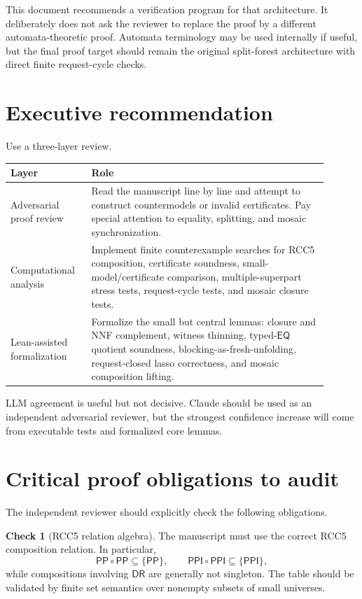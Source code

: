 \documentclass[11pt]{article}
\newcommand{\EQ}{\mathsf{EQ}}
\newcommand{\PP}{\mathsf{PP}}
\newcommand{\PPI}{\mathsf{PPI}}
\newcommand{\DR}{\mathsf{DR}}
\theoremstyle{definition}
\newtheorem{checkitem}{Check}
\theoremstyle{plain}
\begin{document}
This document recommends a verification program for that architecture.  It deliberately does not ask the reviewer to replace the proof by a different automata-theoretic proof.  Automata terminology may be used internally if useful, but the final proof target should remain the original split-forest architecture with direct finite request-cycle checks.

\section{Executive recommendation}

Use a three-layer review.
\begin{center}
\begin{tabular}{p{0.22\linewidth}p{0.68\linewidth}}
\toprule
Layer & Role \\
\midrule
Adversarial proof review & Read the manuscript line by line and attempt to construct countermodels or invalid certificates.  Pay special attention to equality, splitting, and mosaic synchronization. \\
Computational analysis & Implement finite counterexample searches for RCC5 composition, certificate soundness, small-model/certificate comparison, multiple-superpart stress tests, request-cycle tests, and mosaic closure tests. \\
Lean-assisted formalization & Formalize the small but central lemmas: closure and NNF complement, witness thinning, typed-\(\EQ\) quotient soundness, blocking-as-fresh-unfolding, request-closed lasso correctness, and mosaic composition lifting. \\
\bottomrule
\end{tabular}
\end{center}

LLM agreement is useful but not decisive.  Claude should be used as an independent adversarial reviewer, but the strongest confidence increase will come from executable tests and formalized core lemmas.

\section{Critical proof obligations to audit}

The independent reviewer should explicitly check the following obligations.

\begin{checkitem}[RCC5 relation algebra]
The manuscript must use the correct RCC5 composition relation.  In particular,
\[
\PP\circ\PP \subseteq \{\PP\},\qquad
\PPI\circ\PPI \subseteq \{\PPI\},
\]
while compositions involving \(\DR\) are generally not singleton.  The table should be validated by finite set semantics over nonempty subsets of small universes.
\end{checkitem}
\end{document}
